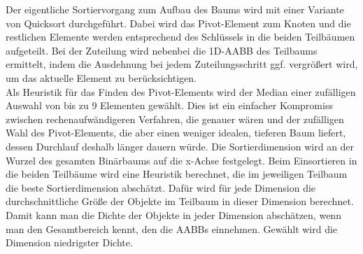 Der eigentliche Sortiervorgang zum Aufbau des Baums wird mit einer Variante von Quicksort durchgeführt. Dabei wird das Pivot-Element zum Knoten und die restlichen Elemente werden entsprechend des Schlüssels in die beiden Teilbäumen aufgeteilt. Bei der Zuteilung wird nebenbei die 1D-AABB des Teilbaums ermittelt, indem die Ausdehnung bei jedem Zuteilungsschritt ggf. vergrößert wird, um das aktuelle Element zu berücksichtigen.\\
Als Heuristik für das Finden des Pivot-Elements wird der Median einer zufälligen Auswahl von bis zu 9 Elementen gewählt. Dies ist ein einfacher Kompromiss zwischen rechenaufwändigeren Verfahren, die genauer wären und der zufälligen Wahl des Pivot-Elements, die aber einen weniger idealen, tieferen Baum liefert, dessen Durchlauf deshalb länger dauern würde. Die Sortierdimension wird an der Wurzel des gesamten Binärbaums auf die x-Achse festgelegt. 
Beim Einsortieren in die beiden Teilbäume wird eine Heuristik berechnet, die im jeweiligen Teilbaum die beste Sortierdimension abschätzt. Dafür wird für jede Dimension die durchschnittliche Größe der Objekte im Teilbaum in dieser Dimension berechnet. Damit kann man die Dichte der Objekte in jeder Dimension abschätzen, wenn man den Gesamtbereich kennt, den die AABBs einnehmen. Gewählt wird die Dimension niedrigster Dichte.\\
